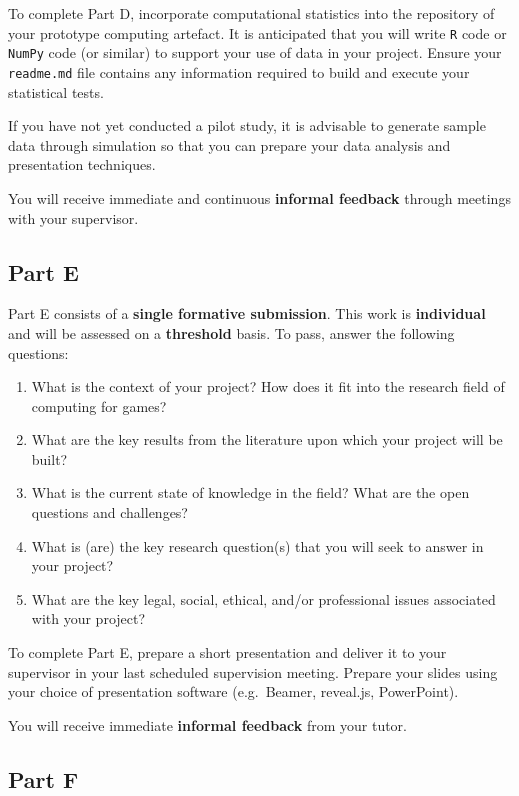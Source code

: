 To complete Part D, incorporate computational statistics into the repository of your prototype computing artefact.
It is anticipated that you will write \texttt{R} code or \texttt{NumPy} code (or similar) to support your use of data in your project.
Ensure your \texttt{readme.md} file contains any information required to build and execute your statistical tests.

If you have not yet conducted a pilot study, it is advisable to generate sample data through simulation so that you can 
prepare your data analysis and presentation techniques.

You will receive immediate and continuous \textbf{informal feedback} through meetings with your supervisor.

\subsection*{Part E}

Part E consists of a \textbf{single formative submission}.
This work is \textbf{individual} and will be assessed on a \textbf{threshold} basis.
To pass, answer the following questions:

\begin{enumerate}[label=(\roman*)]
	\item What is the context of your project? How does it fit into the
		research field of computing for games?
	\item What are the key results from the literature upon which your project will be built?
	\item What is the current state of knowledge in the field?
		What are the open questions and challenges?
	\item What is (are) the key research question(s) that you will seek to
		answer in your project?
	\item What are the key legal, social, ethical, and/or professional issues 
		associated with your project?
\end{enumerate}

To complete Part E, prepare a short presentation 
and deliver it to your supervisor in your last scheduled supervision meeting.
Prepare your slides using your choice of presentation software
(e.g.\ Beamer, reveal.js, PowerPoint).

You will receive immediate \textbf{informal feedback} from your tutor.

\subsection*{Part F}

